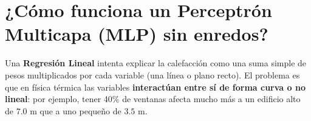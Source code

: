 \documentclass[11pt,a4paper]{article}
\begin{document}
\section{¿Cómo funciona un Perceptrón Multicapa (MLP) sin enredos?}

Una \textbf{Regresión Lineal} intenta explicar la calefacción como una suma simple de pesos multiplicados por cada variable (una línea o plano recto). El problema es que en física térmica las variables \textbf{interactúan entre sí de forma curva o no lineal}: por ejemplo, tener 40\% de ventanas afecta mucho más a un edificio alto de $7.0\text{ m}$ que a uno pequeño de $3.5\text{ m}$.
\end{document}
